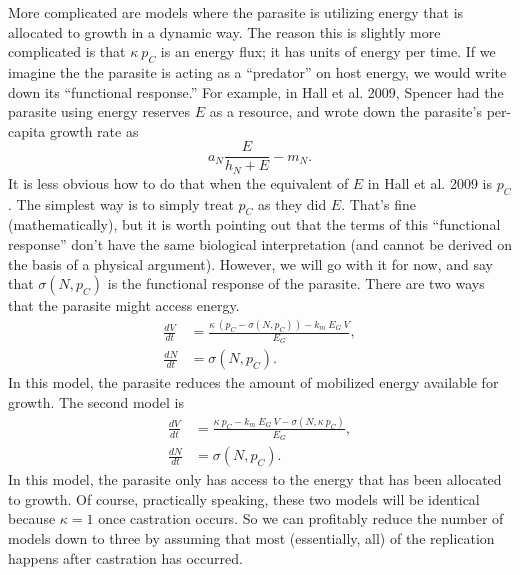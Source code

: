 \documentclass[12pt,reqno,final,pdftex]{amsart}\usepackage[]{graphicx}\usepackage[]{color}
\theoremstyle{plain}
\numberwithin{equation}{part}
\begin{document}
More complicated are models where the parasite is utilizing energy that is allocated to growth in a dynamic way.
The reason this is slightly more complicated is that $\kappa~p_C$ is an energy flux; it has units of energy per time.
If we imagine the the parasite is acting as a ``predator'' on host energy, we would write down its ``functional response.''
For example, in Hall et al. 2009, Spencer had the parasite using energy reserves $E$ as a resource, and wrote down the parasite's per-capita growth rate as
\begin{equation}
a_N \frac{E}{h_N+E}-m_N.
\end{equation}
It is less obvious how to do that when the equivalent of $E$ in Hall et al. 2009 is $p_C$.
The simplest way is to simply treat $p_C$ as they did $E$.
That's fine (mathematically), but it is worth pointing out that the terms of this ``functional response'' don't have the same biological interpretation (and cannot be derived on the basis of a physical argument).
However, we will go with it for now, and say that $\sigma(N,p_C)$ is the functional response of the parasite.
There are two ways that the parasite might access energy.
\begin{align}
\frac{dV}{dt} &= \frac{\kappa~(p_C - \sigma(N,p_C)) - k_m~E_G~V}{E_G}, \\
\frac{dN}{dt} &= \sigma(N,p_C).
\end{align}
In this model, the parasite reduces the amount of mobilized energy available for growth.
The second model is
\begin{align}
\frac{dV}{dt} &= \frac{\kappa~p_C - k_m~E_G~V - \sigma(N,\kappa~p_C)}{E_G}, \\
\frac{dN}{dt} &= \sigma(N,p_C).
\end{align}
In this model, the parasite only has access to the energy that has been allocated to growth.
Of course, practically speaking, these two models will be identical because $\kappa=1$ once castration occurs.
So we can profitably reduce the number of models down to three by assuming that most (essentially, all) of the replication happens after castration has occurred.
\end{document}

